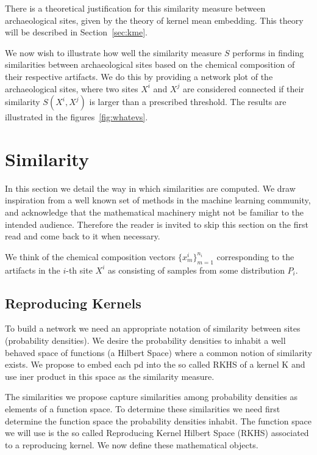 There is a theoretical justification for this similarity measure between archaeological sites, given by the theory of kernel mean embedding. This theory will be described in Section~\ref{sec:kme}.

We now wish to illustrate how well the similarity measure $S$ performs in finding similarities between archaeological sites based on the chemical composition of their respective artifacts. We do this by providing a network plot of the archaeological sites, where two sites $X^i$ and $X^j$ are considered connected if their similarity $S(X^i,X^j)$ is larger than a prescribed threshold. The results are illustrated in the figures~\ref{fig:whatevs}.

\section{Similarity}

\label{sec:similarity}

In this section we detail the way in which similarities are computed. We draw inspiration from a well known set of methods in the machine learning community, and acknowledge that the mathematical machinery might not be familiar to the intended audience. Therefore the reader is invited to skip this section on the first read and come back to it when necessary.

We think of the chemical composition vectors $\{x^i_m\}_{m=1}^{n_i}$ corresponding to the artifacts in the $i$-th site $X^i$ as consisting of samples from some distribution $P_i$.

\subsection{Reproducing Kernels}

\label{kernels}

To build a network we need an appropriate notation of similarity between sites (probability densities). We desire the probability densities to inhabit a well behaved space of functions (a Hilbert Space) where a common notion of similarity exists. We propose to embed each pd into the so called RKHS of a kernel K and use iner product in this space as the similarity measure.

The similarities we propose capture similarities among probability densities as elements of a function space. To determine these similarities we need first determine the function space the probability densities inhabit. The function space we will use is the so called Reproducing Kernel Hilbert Space (RKHS) associated to a reproducing kernel. We now define these mathematical objects.

